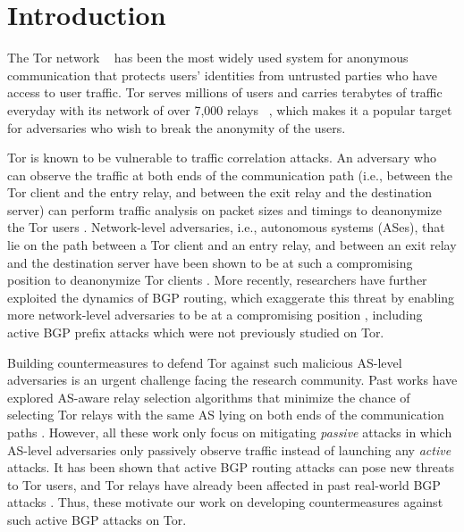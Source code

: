 \section{Introduction}

The Tor network ~\cite{dingledine2004tor} has been the most widely used system for anonymous communication that protects users' identities from untrusted parties who have access to user traffic. Tor serves millions of users and carries terabytes of traffic everyday with its network of over 7,000 relays ~\cite{tormetrics}, which makes it a popular target for adversaries who wish to break the anonymity of the users. 

Tor is known to be vulnerable to traffic correlation attacks. An adversary who can observe the traffic at both ends of the communication path (i.e., between the Tor client and the entry relay, and between the exit relay and the destination server) can perform traffic analysis on packet sizes and timings to deanonymize the Tor users \cite{shmatikov2006timing, syverson2001towards}. Network-level adversaries, i.e., autonomous systems (ASes), that lie on the path between a Tor client and an entry relay, and between an exit relay and the destination server have been shown to be at such a compromising position to deanonymize Tor clients \cite{edman2009awareness, feamster2004location, johnson2013users}. More recently, researchers have further exploited the dynamics of BGP routing, which exaggerate this threat by enabling more network-level adversaries to be at a compromising position \cite{sun2015raptor}, including active BGP prefix attacks which were not previously studied on Tor. 

Building countermeasures to defend Tor against such malicious AS-level adversaries is an urgent challenge facing the research community. Past works have explored AS-aware relay selection algorithms that minimize the chance of selecting Tor relays with the same AS lying on both ends of the communication paths \cite{akhoondi2012lastor, edman2009awareness, starov2015measuring}. However, all these work only focus on mitigating \emph{passive} attacks in which AS-level adversaries only passively observe traffic instead of launching any \emph{active} attacks. It has been shown that active BGP routing attacks can pose new threats to Tor users, and Tor relays have already been affected in past real-world BGP attacks \cite{sun2015raptor}. Thus, these motivate our work on developing countermeasures against such active BGP attacks on Tor. 

